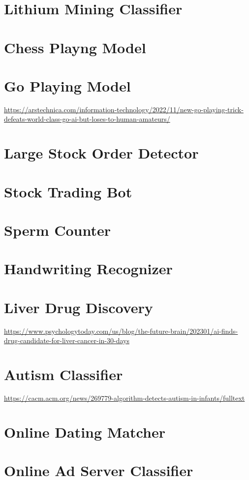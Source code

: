 \section{Lithium Mining Classifier}
\section{Chess Playng Model}
\section{Go Playing Model}

\url{https://arstechnica.com/information-technology/2022/11/new-go-playing-trick-defeats-world-class-go-ai-but-loses-to-human-amateurs/}

\section{Large Stock Order Detector}
\section{Stock Trading Bot}
\section{Sperm Counter}
\section{Handwriting Recognizer}
\section{Liver Drug Discovery}

\url{https://www.psychologytoday.com/us/blog/the-future-brain/202301/ai-finds-drug-candidate-for-liver-cancer-in-30-days}

\section{Autism Classifier}

\url{https://cacm.acm.org/news/269779-algorithm-detects-autism-in-infants/fulltext}

\section{Online Dating Matcher}
\section{Online Ad Server Classifier}
